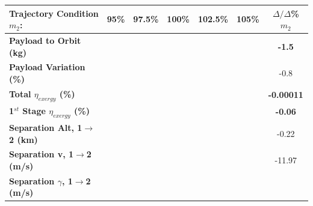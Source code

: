 \begin{table}[ht]
	\centering
	
	
\begin{tabular}{l c c c c c c} 
	\hline \textbf{Trajectory Condition}   \qquad  $m_{2}$:
	&95\%
	&97.5\%
	&100\%
	&102.5\%
	&105\%
	& $\Delta/\Delta$\%$m_{2}$
	\\
	\hline \textbf{Payload to Orbit (kg)}
	& \textbf{\PayloadToOrbitmSPARTANNinetyFiveNoReturn}
	& \textbf{\PayloadToOrbitmSPARTANNinetySevenFiveNoReturn}
	& \textbf{\PayloadToOrbitmSPARTANStandardNoReturn}
	& \textbf{\PayloadToOrbitmSPARTANOneHundredTwoFiveNoReturn}
	& \textbf{\PayloadToOrbitmSPARTANOneHundredFiveNoReturn}
	&\textbf{-1.5}
	\\
	\textbf{Payload Variation (\%)}
	& \PayloadVarmSPARTANNinetyFiveNoReturn
	& \PayloadVarmSPARTANNinetySevenFiveNoReturn
	& \PayloadVarmSPARTANStandardNoReturn
	& \PayloadVarmSPARTANOneHundredTwoFiveNoReturn
	& \PayloadVarmSPARTANOneHundredFiveNoReturn
	&-0.8
	\\
	\textbf{Total $\eta_{exergy}$ (\%)}
	& \textbf{\totalExergyEffmSPARTANNinetyFiveNoReturn}
	& \textbf{\totalExergyEffmSPARTANNinetySevenFiveNoReturn}
	& \textbf{\totalExergyEffmSPARTANStandardNoReturn}
	& \textbf{\totalExergyEffmSPARTANOneHundredTwoFiveNoReturn}
	& \textbf{\totalExergyEffmSPARTANOneHundredFiveNoReturn}
	& \textbf{-0.00011}
	\\
	\hline 
	\textbf{1$^{st}$ Stage $\eta_{exergy}$ (\%)}
	& \textbf{\firstExergyEffmSPARTANNinetyFiveNoReturn}
	& \textbf{\firstExergyEffmSPARTANNinetySevenFiveNoReturn}
	& \textbf{\firstExergyEffmSPARTANStandardNoReturn}
	& \textbf{\firstExergyEffmSPARTANOneHundredTwoFiveNoReturn}
	& \textbf{\firstExergyEffmSPARTANOneHundredFiveNoReturn}
	& \textbf{-0.06}
	\\
	\textbf{Separation Alt, 1$\rightarrow$2 (km)}
	& \firstsecondSeparationAltmSPARTANNinetyFiveNoReturn
	& \firstsecondSeparationAltmSPARTANNinetySevenFiveNoReturn
	& \firstsecondSeparationAltmSPARTANStandardNoReturn
	& \firstsecondSeparationAltmSPARTANOneHundredTwoFiveNoReturn
	& \firstsecondSeparationAltmSPARTANOneHundredFiveNoReturn
	&-0.22
	\\
	\textbf{Separation v, 1$\rightarrow$2 (m/s)}
	& \firstsecondSeparationvmSPARTANNinetyFiveNoReturn
	& \firstsecondSeparationvmSPARTANNinetySevenFiveNoReturn
	& \firstsecondSeparationvmSPARTANStandardNoReturn
	& \firstsecondSeparationvmSPARTANOneHundredTwoFiveNoReturn
	& \firstsecondSeparationvmSPARTANOneHundredFiveNoReturn
	&-11.97
	\\
	\textbf{Separation $\gamma$, 1$\rightarrow$2 (m/s)}

\end{tabular}
\end{table}
